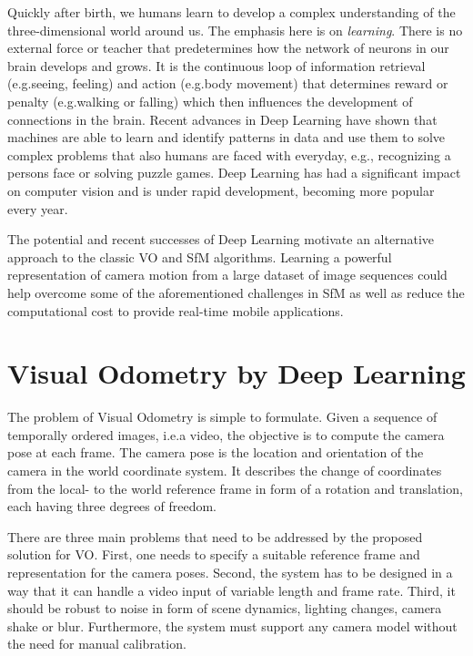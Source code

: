 		Quickly after birth, we humans learn to develop a complex understanding of the three-dimensional world around us. 
		The emphasis here is on \emph{learning}.
		There is no external force or teacher that predetermines how the network of neurons in our brain develops and grows.
		It is the continuous loop of information retrieval (e.g.\@ seeing, feeling) and action (e.g.\@ body movement) that determines reward or penalty (e.g.\@ walking or falling) which then influences the development of connections in the brain.
		Recent advances in Deep Learning have shown that machines are able to learn and identify patterns in data and use them to solve complex problems that also humans are faced with everyday, e.g., recognizing a persons face or solving puzzle games.
		Deep Learning has had a significant impact on computer vision and is under rapid development, becoming more popular every year.
		
		The potential and recent successes of Deep Learning motivate an alternative approach to the classic VO and SfM algorithms.
		Learning a powerful representation of camera motion from a large dataset of image sequences could help overcome some of the aforementioned challenges in SfM as well as reduce the computational cost to provide real-time mobile applications.
		
	\section{Visual Odometry by Deep Learning}
		
		The problem of Visual Odometry is simple to formulate.
		Given a sequence of temporally ordered images, i.e.\@ a video, the objective is to compute the camera pose at each frame.
		The camera pose is the location and orientation of the camera in the world coordinate system.
		It describes the change of coordinates from the local- to the world reference frame in form of a rotation and translation, each having three degrees of freedom.

		There are three main problems that need to be addressed by the proposed solution for VO.
		First, one needs to specify a suitable reference frame and representation for the camera poses.
		Second, the system has to be designed in a way that it can handle a video input of variable length and frame rate.
		Third, it should be robust to noise in form of scene dynamics, lighting changes, camera shake or blur.
		Furthermore, the system must support any camera model without the need for manual calibration.
		

